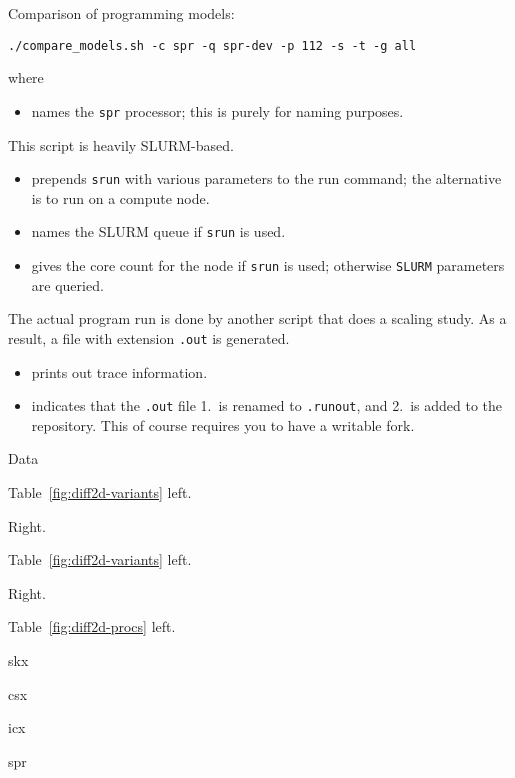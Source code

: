 \documentclass[11pt,fleqn]{artikel3}
\begin{document}
Comparison of programming models:
\begin{lstlisting}
./compare_models.sh -c spr -q spr-dev -p 112 -s -t -g all
\end{lstlisting}
where
\begin{itemize}
\item {} names the \lstinline{spr} processor; this is purely for naming purposes.
\end{itemize}
This script is heavily SLURM-based.
\begin{itemize}
\item {} prepends \lstinline{srun} with various parameters to the run command;
  the alternative is to run on a compute node.
\item {} names the SLURM queue if \lstinline{srun} is used.
\item {} gives the core count for the node if \lstinline{srun} is used;
  otherwise \lstinline{SLURM} parameters are queried.
\end{itemize}
The actual program run is done by another script that does a scaling study.
As a result, a file with extension \lstinline{.out} is generated.
\begin{itemize}
\item {} prints out trace information.
\item {} indicates that the \lstinline{.out} file 1.~is renamed to \lstinline{.runout},
  and 2.~is added to the repository. This of course requires you to have a writable fork.
\end{itemize}

 {Data}

Table~\ref{fig:diff2d-variants} left.



Right.



Table~\ref{fig:diff2d-variants} left.



Right.



Table~\ref{fig:diff2d-procs} left.

skx



csx



icx



spr


\end{document}
